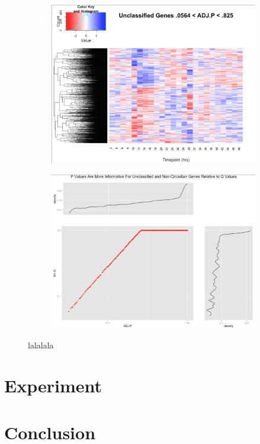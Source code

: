 \documentclass[prl,amsmath,amssymb,floatfix,superscriptaddress,notitlepage,twocolumn]{revtex4}
\begin{document}
\begin{figure}[t]
\begin{subfigure}[t]{0.3\textwidth}
    \includegraphics[width=\textwidth]{Unclassified.png}
    \label{fig:Unclassified}
\end{subfigure}
\begin{subfigure}[t]{0.3\textwidth}
    \includegraphics[width=\textwidth]{PvsQ.png}
    \label{fig:PvsQ}
    \end{subfigure} 
\caption{lalalala}
\vfill
\end{figure}
\section{Experiment}

\section{Conclusion}



\end{document}
